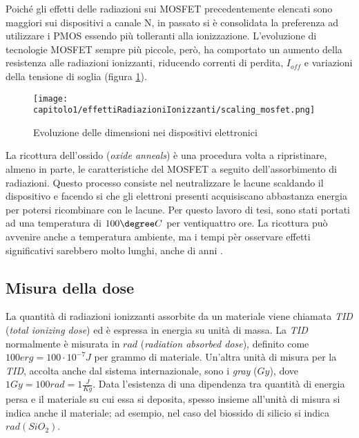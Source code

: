 Poiché gli effetti delle radiazioni sui MOSFET precedentemente elencati sono maggiori sui dispositivi a canale N, in passato si è consolidata la preferenza ad utilizzare i PMOS essendo più tolleranti alla ionizzazione. L'evoluzione di tecnologie MOSFET sempre più piccole, però, ha comportato un aumento della resistenza alle radiazioni ionizzanti, riducendo correnti di perdita, $I_{off}$ e variazioni della tensione di soglia (figura \ref{fig:scaling_mosfet}).  

\begin{figure}[ht]
	\centering

	\texttt{[image: capitolo1/effettiRadiazioniIonizzanti/scaling\_mosfet.png]}
	\caption[Scaling dei dispositivi elettroni]{Evoluzione delle dimensioni nei dispositivi elettronici \cite{effetti_radiazioni_scaling:Nanoelectronics_and_nanolithography}}
	\label{fig:scaling_mosfet}
\end{figure}


\vspace{0.5cm}

La ricottura dell'ossido (\textit{oxide anneals}) è una procedura volta a ripristinare, almeno in parte, le caratteristiche del MOSFET a seguito dell'assorbimento di radiazioni.
Questo processo consiste nel neutralizzare le lacune scaldando il dispositivo e facendo si che gli elettroni presenti acquisiscano abbastanza energia per potersi ricombinare con le lacune. Per questo lavoro di tesi, sono stati portati ad una temperatura di $100\degree C$ per ventiquattro ore. La ricottura può avvenire anche a temperatura ambiente, ma i tempi pèr osservare effetti significativi sarebbero molto lunghi, anche di anni \cite{bib:Effetti_Radiazioni_NASA}. 

\subsection{Misura della dose}
La quantità di radiazioni ionizzanti assorbite da un materiale viene chiamata \textit{TID} (\textit{total ionizing dose}) ed è espressa in energia su unità di massa.
La \textit{TID} normalmente è misurata in $rad$ (\textit{radiation absorbed dose}), definito come $100 erg  = 100 \cdot 10^{-7} J$ per grammo di materiale. Un'altra unità di misura per la \textit{TID}, accolta anche dal sistema internazionale, sono i \textit{gray} ($Gy$), dove $1 Gy = 100rad = 1\frac{J}{Kg}$.
Data l'esistenza di una dipendenza tra quantità di energia persa e il materiale su cui essa si deposita, spesso insieme all'unità di misura si indica anche il materiale; ad esempio, nel caso del biossido di silicio si indica $rad(SiO_{2})$. 



